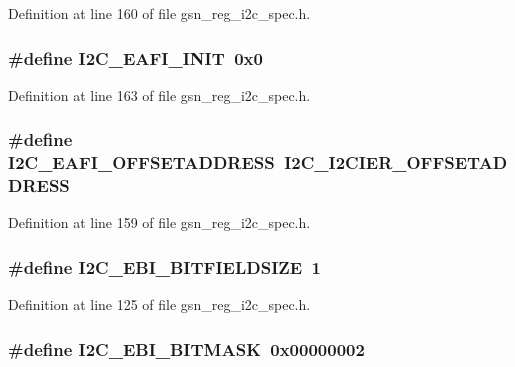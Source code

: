 Definition at line 160 of file gsn\_\-reg\_\-i2c\_\-spec.h.

\hypertarget{a00558_a3dea330274846425ce62f8f8fef61329}{
\subsubsection[{I2C\_\-EAFI\_\-INIT}]{\setlength{\rightskip}{0pt plus 5cm}\#define I2C\_\-EAFI\_\-INIT~0x0}}
\label{a00558_a3dea330274846425ce62f8f8fef61329}


Definition at line 163 of file gsn\_\-reg\_\-i2c\_\-spec.h.

\hypertarget{a00558_a3d23db967c6d3739ada21a39d1ff5fac}{
\subsubsection[{I2C\_\-EAFI\_\-OFFSETADDRESS}]{\setlength{\rightskip}{0pt plus 5cm}\#define I2C\_\-EAFI\_\-OFFSETADDRESS~I2C\_\-I2CIER\_\-OFFSETADDRESS}}
\label{a00558_a3d23db967c6d3739ada21a39d1ff5fac}


Definition at line 159 of file gsn\_\-reg\_\-i2c\_\-spec.h.

\hypertarget{a00558_a6e1f892aa617f719cbc7ed50339ff4d4}{
\subsubsection[{I2C\_\-EBI\_\-BITFIELDSIZE}]{\setlength{\rightskip}{0pt plus 5cm}\#define I2C\_\-EBI\_\-BITFIELDSIZE~1}}
\label{a00558_a6e1f892aa617f719cbc7ed50339ff4d4}


Definition at line 125 of file gsn\_\-reg\_\-i2c\_\-spec.h.

\hypertarget{a00558_aca503434f53718ea2884ac687fa31817}{
\subsubsection[{I2C\_\-EBI\_\-BITMASK}]{\setlength{\rightskip}{0pt plus 5cm}\#define I2C\_\-EBI\_\-BITMASK~0x00000002}}
\label{a00558_aca503434f53718ea2884ac687fa31817}


